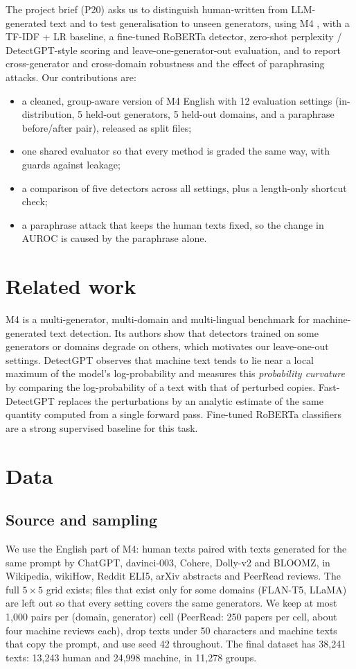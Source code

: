 \documentclass{nle}
\begin{document}
The project brief (P20) asks us to distinguish human-written from LLM-generated text and to test generalisation to
unseen generators, using M4 \cite{wang24}, with a TF-IDF + LR baseline, a fine-tuned RoBERTa detector, zero-shot
perplexity / DetectGPT-style scoring and leave-one-generator-out evaluation, and to report cross-generator and
cross-domain robustness and the effect of paraphrasing attacks. Our contributions are:
\begin{itemize}
  \item a cleaned, group-aware version of M4 English with 12 evaluation settings (in-distribution, 5 held-out
        generators, 5 held-out domains, and a paraphrase before/after pair), released as split files;
  \item one shared evaluator so that every method is graded the same way, with guards against leakage;
  \item a comparison of five detectors across all settings, plus a length-only shortcut check;
  \item a paraphrase attack that keeps the human texts fixed, so the change in AUROC is caused by the paraphrase alone.
\end{itemize}

\section{Related work}

M4 \cite{wang24} is a multi-generator, multi-domain and multi-lingual benchmark for machine-generated text detection.
Its authors show that detectors trained on some generators or domains degrade on others, which motivates our
leave-one-out settings. DetectGPT \cite{mitchell23} observes that machine text tends to lie near a local maximum of
the model's log-probability and measures this \emph{probability curvature} by comparing the log-probability of a text
with that of perturbed copies. Fast-DetectGPT \cite{bao24} replaces the perturbations by an analytic estimate of the
same quantity computed from a single forward pass. Fine-tuned RoBERTa classifiers \cite{liu19} are a strong
supervised baseline for this task.

\section{Data}

\subsection{Source and sampling}
We use the English part of M4: human texts paired with texts generated for the same prompt by ChatGPT, davinci-003,
Cohere, Dolly-v2 and BLOOMZ, in Wikipedia, wikiHow, Reddit ELI5, arXiv abstracts and PeerRead reviews. The full
$5 \times 5$ grid exists; files that exist only for some domains (FLAN-T5, LLaMA) are left out so that every setting
covers the same generators. We keep at most 1,000 pairs per (domain, generator) cell (PeerRead: 250 papers per cell,
about four machine reviews each), drop texts under 50 characters and machine texts that copy the prompt, and use seed
42 throughout. The final dataset has 38,241 texts: 13,243 human and 24,998 machine, in 11,278 groups.
\end{document}
